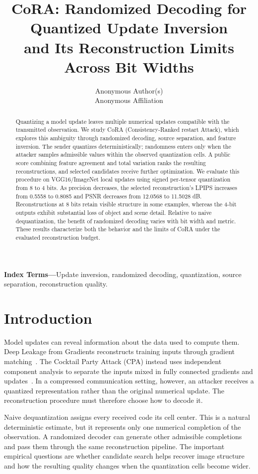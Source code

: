 \documentclass[10pt,twocolumn]{article}
\title{CoRA: Randomized Decoding for Quantized Update Inversion\\
and Its Reconstruction Limits Across Bit Widths}
\author{Anonymous Author(s)\\Anonymous Affiliation}
\date{}
\newcommand{\cora}{CoRA}
\begin{document}
\maketitle

\begin{abstract}
Quantizing a model update leaves multiple numerical updates compatible with
the transmitted observation. We study \cora{} (Consistency-Ranked restart
Attack), which explores this ambiguity through randomized decoding,
source separation, and feature inversion. The sender quantizes
deterministically; randomness enters only when the attacker samples
admissible values within the observed quantization cells. A public score
combining feature agreement and total variation ranks the resulting
reconstructions, and selected candidates receive further optimization.
We evaluate this procedure on VGG16/ImageNet local updates using signed
per-tensor quantization from 8 to 4 bits. As precision decreases, the
selected reconstruction's LPIPS increases from 0.5558 to 0.8085 and PSNR
decreases from 12.0568 to 11.5028 dB. Reconstructions at 8 bits retain
visible structure in some examples, whereas the 4-bit outputs exhibit
substantial loss of object and scene detail. Relative to naive
dequantization, the benefit of randomized decoding varies with bit width
and metric. These results characterize both the behavior and the limits
of \cora{} under the evaluated reconstruction budget.
\end{abstract}

\noindent\textbf{Index Terms---}Update inversion, randomized decoding,
quantization, source separation, reconstruction quality.

\section{Introduction}
\label{sec:intro}
Model updates can reveal information about the data used to compute them.
Deep Leakage from Gradients reconstructs training inputs through gradient
matching~\cite{zhu2019deep}. The Cocktail Party Attack (CPA) instead uses
independent component analysis to separate the inputs mixed in fully
connected gradients and updates~\cite{kariyappa2023cocktail}.
In a compressed communication setting, however, an attacker receives a
quantized representation rather than the original numerical update.
The reconstruction procedure must therefore choose how to decode it.

Naive dequantization assigns every received code its cell center. This is
a natural deterministic estimate, but it represents only one numerical
completion of the observation. A randomized decoder can generate other
admissible completions and pass them through the same reconstruction
pipeline. The important empirical questions are whether candidate search
helps recover image structure and how the resulting quality changes when
the quantization cells become wider.
\end{document}
